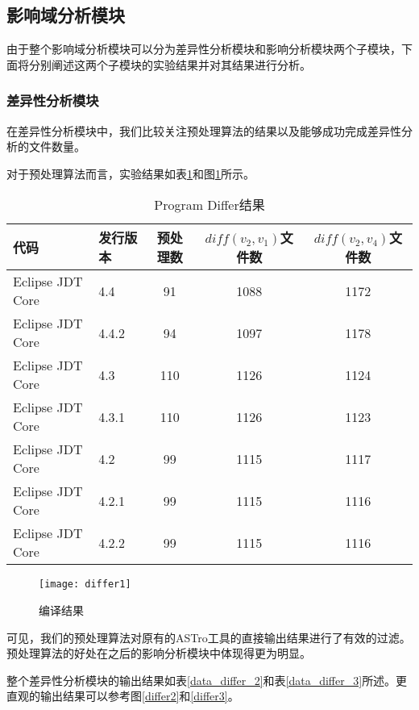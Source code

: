 \subsection{影响域分析模块}

由于整个影响域分析模块可以分为差异性分析模块和影响分析模块两个子模块，下面将分别阐述这两个子模块的实验结果并对其结果进行分析。

\subsubsection{差异性分析模块}

在差异性分析模块中，我们比较关注预处理算法的结果以及能够成功完成差异性分析的文件数量。

对于预处理算法而言，实验结果如表\ref {data_differ_1}和图\ref {differ1}所示。

\begin{table}[H]
	\caption{Program Differ结果}
	\label{data_differ_1}
	\centering
	\begin{tabular}{llccc}
		\toprule[1.5pt]
		{\heiti 代码} & {\heiti 发行版本} & {\heiti 预处理数} & {\heiti $diff(v_2,v_1)$文件数} & {\heiti $diff(v_2,v_4)$文件数} \\\midrule[1pt]
		Eclipse JDT Core & 4.4	& 91 & 1088 & 1172	\\		
		Eclipse JDT Core & 4.4.2 & 94 & 1097 & 1178		\\
		Eclipse JDT Core & 4.3 	& 110 & 1126 & 1124			\\
		Eclipse JDT Core & 4.3.1 & 110 & 1126 & 1123			\\
		Eclipse JDT Core & 4.2 	& 99 & 1115 & 1117		\\
		Eclipse JDT Core & 4.2.1 & 99 & 1115 & 1116			\\
		Eclipse JDT Core & 4.2.2 & 99 & 1115 & 1116		\\
		\bottomrule[1.5pt]
	\end{tabular}
\end{table}

\begin{figure}[H]
	\centering
	\texttt{[image: differ1]}
	\caption {编译结果}
	\label {differ1}	
\end{figure}

可见，我们的预处理算法对原有的ASTro工具的直接输出结果进行了有效的过滤。预处理算法的好处在之后的影响分析模块中体现得更为明显。

整个差异性分析模块的输出结果如表\ref {data_differ_2}和表\ref {data_differ_3}所述。更直观的输出结果可以参考图\ref {differ2}和\ref {differ3}。

